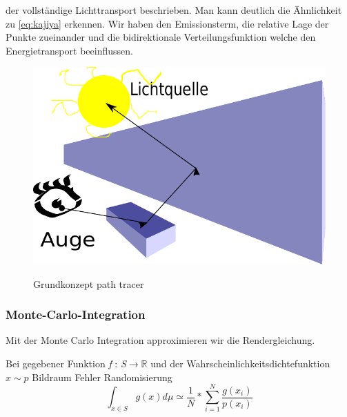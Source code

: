 der vollständige Lichttransport beschrieben. Man kann deutlich die Ähnlichkeit
zu \ref{eq:kajiya} erkennen. Wir haben den Emissionsterm, die relative Lage der 
Punkte zueinander und die bidirektionale Verteilungsfunktion welche den Energietransport
beeinflussen.

\begin{figure}[H]
    \centering
    \includegraphics[width=0.7\linewidth]{content/PathTracer/Bilder/Grundkonzept_path_tracing.pdf}
    \label{pic::PathTracingGrundkonzept}
    \caption{Grundkonzept path tracer}
\end{figure}

\subsubsection{Monte-Carlo-Integration}
Mit der Monte Carlo Integration approximieren wir die Rendergleichung.\par 
Bei gegebener Funktion \textit{f }:\textit{ S}$\rightarrow \mathbb{R}$ und der 
Wahrscheinlichkeitsdichtefunktion $x \sim p$
\cite{KK02}
\cite{caflisch_1998}
Bildraum Fehler Randomisierung
\label{pic:MonteCarloIntegration}
\begin{equation}\label{eq:montcarlo}
    \int_{x\in S} g(x) d\mu \simeq \frac{1}{N}*\sum_{i=1}^{N}\frac{g(x_i)}{p(x_i)}
\end{equation}

